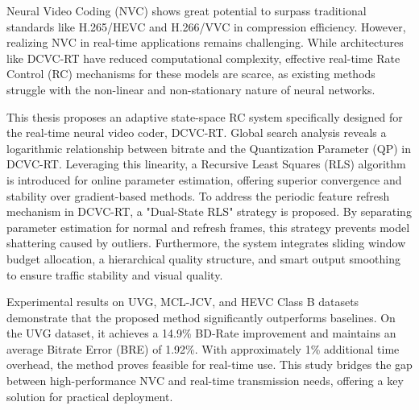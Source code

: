 \begin{abstract*}

Neural Video Coding (NVC) shows great potential to surpass traditional standards like H.265/HEVC and H.266/VVC in compression efficiency. However, realizing NVC in real-time applications remains challenging. While architectures like DCVC-RT have reduced computational complexity, effective real-time Rate Control (RC) mechanisms for these models are scarce, as existing methods struggle with the non-linear and non-stationary nature of neural networks.

This thesis proposes an adaptive state-space RC system specifically designed for the real-time neural video coder, DCVC-RT. Global search analysis reveals a logarithmic relationship between bitrate and the Quantization Parameter (QP) in DCVC-RT. Leveraging this linearity, a Recursive Least Squares (RLS) algorithm is introduced for online parameter estimation, offering superior convergence and stability over gradient-based methods. To address the periodic feature refresh mechanism in DCVC-RT, a "Dual-State RLS" strategy is proposed. By separating parameter estimation for normal and refresh frames, this strategy prevents model shattering caused by outliers. Furthermore, the system integrates sliding window budget allocation, a hierarchical quality structure, and smart output smoothing to ensure traffic stability and visual quality.

Experimental results on UVG, MCL-JCV, and HEVC Class B datasets demonstrate that the proposed method significantly outperforms baselines. On the UVG dataset, it achieves a 14.9\% BD-Rate improvement and maintains an average Bitrate Error (BRE) of 1.92\%. With approximately 1\% additional time overhead, the method proves feasible for real-time use. This study bridges the gap between high-performance NVC and real-time transmission needs, offering a key solution for practical deployment.

\end{abstract*}
